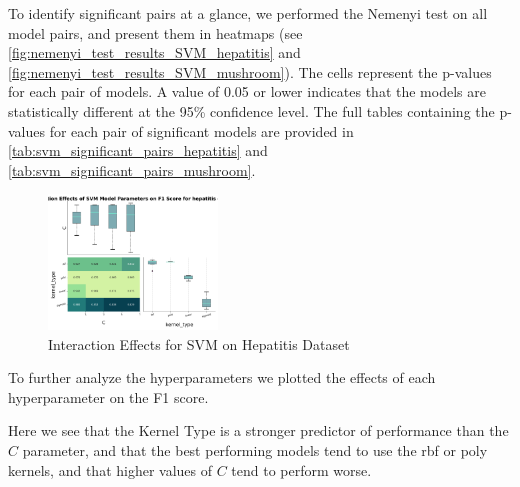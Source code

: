 To identify significant pairs at a glance, we performed the Nemenyi test on all model pairs,
and present them in heatmaps (see \autoref{fig:nemenyi_test_results_SVM_hepatitis} and \autoref{fig:nemenyi_test_results_SVM_mushroom}).
The cells represent the p-values for each pair of models. A value of 0.05 or lower indicates that the models are statistically different
at the 95\% confidence level. The full tables containing the p-values for each pair of significant models are provided in \autoref{tab:svm_significant_pairs_hepatitis} and \autoref{tab:svm_significant_pairs_mushroom}.




\begin{figure}
    \centering
    \includegraphics[width=0.4\textwidth]{figures/interaction_effects_SVM_hepatitis.png}
    \caption{Interaction Effects for SVM on Hepatitis Dataset}
    \label{fig:interaction_effects_SVM_hepatitis}
\end{figure}

To further analyze the hyperparameters we plotted the effects of each hyperparameter on the F1 score.

Here we see that the Kernel Type is a stronger predictor of performance than the $C$ parameter, and that
the best performing models tend to use the rbf or poly kernels, and that higher values of $C$ tend to perform worse.
